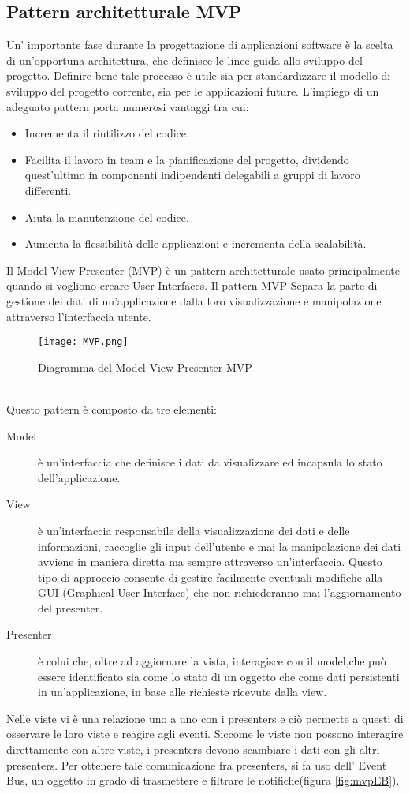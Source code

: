 \FloatBarrier
\subsection{Pattern architetturale MVP}

Un' importante fase durante la progettazione di applicazioni software \`e la scelta di un'opportuna architettura, che definisce le linee guida allo sviluppo del progetto. Definire bene tale processo \`e utile sia per standardizzare il modello di sviluppo del progetto corrente, sia per le applicazioni
future.
L'impiego di un adeguato pattern porta numerosi vantaggi tra cui:
\begin{itemize}
\item Incrementa il riutilizzo del codice.
\item Facilita il lavoro in team e la pianificazione del progetto, dividendo
quest'ultimo in componenti indipendenti delegabili a gruppi di lavoro
differenti.
\item Aiuta la manutenzione del codice.
\item Aumenta la flessibilit\`a delle applicazioni e incrementa della scalabilit\`a.
\end{itemize}
Il Model-View-Presenter (MVP) \`e un pattern architetturale usato principalmente quando si vogliono creare User Interfaces. 
Il pattern MVP Separa la parte di gestione dei dati di un'applicazione dalla loro visualizzazione e manipolazione attraverso l'interfaccia utente. 
\begin{figure}[htbp]
\centering%
\texttt{[image: MVP.png]}%
\caption{Diagramma del Model-View-Presenter MVP}\label{fig:mvp}%
\end{figure}\\
Questo pattern \`e composto da tre elementi:
\begin{description}
\item[Model] \`e un'interfaccia che definisce i dati da visualizzare ed incapsula lo stato dell'applicazione.
\item[View] \`e un'interfaccia responsabile della visualizzazione dei
dati e delle informazioni, raccoglie gli input dell'utente e mai la manipolazione dei dati avviene in maniera diretta ma sempre attraverso un'interfaccia. Questo tipo di approccio consente di gestire facilmente eventuali modifiche alla GUI (Graphical User Interface) che non richiederanno mai l'aggiornamento del presenter.
\item[Presenter]  \`e colui che, oltre ad aggiornare la vista, interagisce con il model,che pu\`o essere identificato sia come lo stato di un oggetto che come dati persistenti in un'applicazione, in base alle richieste ricevute dalla view.
\end{description}
Nelle viste vi \`e una relazione uno a uno con i presenters e ci\`o permette a questi di osservare le loro viste e reagire agli eventi. Siccome le viste non possono interagire direttamente con altre viste, i presenters devono scambiare i dati con gli altri presenters. Per ottenere tale comunicazione  fra presenters, si fa uso dell' Event Bus, un oggetto in grado di trasmettere e filtrare le notifiche(figura \ref{fig:mvpEB}).

